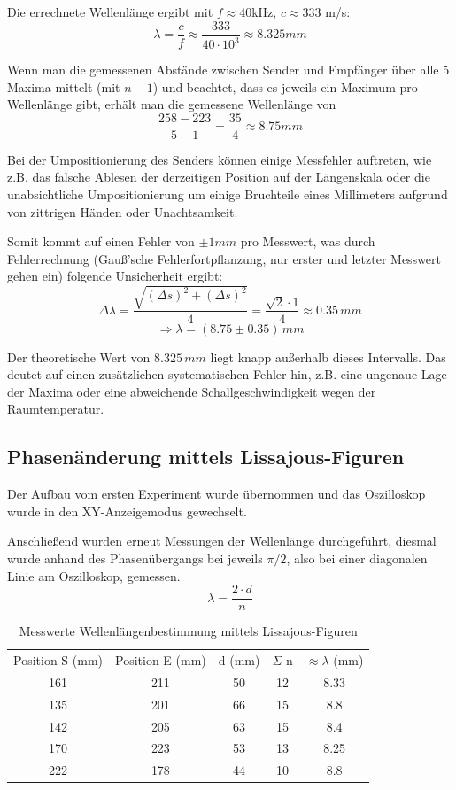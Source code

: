 \documentclass[
  headings=optiontotocandhead,
  twoside,
  openright,
  numbers=noenddot,
  toc=flat,
  11pt,
  parskip=full,
  listof=flat,
  bibliography=totoc,
  a4paper,
  DIV=14,
  BCOR=22mm,
  headheight=5mm,
  headinclude=true,
]{scrartcl}
\begin{document}
Die errechnete Wellenlänge ergibt mit $f \approx 40$kHz, $c \approx 333$ m/s:
$$ \lambda = \frac{c}{f} \approx \frac{333}{40 \cdot 10^3} \approx 8.325 mm $$

Wenn man die gemessenen Abstände zwischen Sender und Empfänger über alle 5 Maxima mittelt (mit $n-1$) und beachtet, dass es jeweils ein Maximum pro Wellenlänge gibt, erhält man die gemessene Wellenlänge von
$$ \frac{258 - 223}{5 - 1} = \frac{35}{4} \approx 8.75mm $$ 

Bei der Umpositionierung des Senders können einige Messfehler auftreten, wie z.B. das falsche Ablesen der derzeitigen Position auf der Längenskala oder die unabsichtliche Umpositionierung um einige Bruchteile eines Millimeters aufgrund von zittrigen Händen oder Unachtsamkeit.

Somit kommt auf einen Fehler von $\pm 1mm$ pro Messwert, was durch Fehlerrechnung (Gauß'sche Fehlerfortpflanzung, nur erster und letzter Messwert gehen ein) folgende Unsicherheit ergibt:
$$ \Delta\lambda = \frac{\sqrt{(\Delta s)^2 + (\Delta s)^2}}{4} = \frac{\sqrt{2} \cdot 1}{4} \approx 0.35\,mm $$
$$ \Rightarrow \lambda = (8.75 \pm 0.35)\,mm $$

Der theoretische Wert von $8.325\,mm$ liegt knapp außerhalb dieses Intervalls. Das deutet auf einen zusätzlichen systematischen Fehler hin, z.B. eine ungenaue Lage der Maxima oder eine abweichende Schallgeschwindigkeit wegen der Raumtemperatur.

\subsection{Phasenänderung mittels Lissajous-Figuren}

Der Aufbau vom ersten Experiment wurde übernommen und das Oszilloskop wurde in den XY-Anzeigemodus gewechselt.

Anschließend wurden erneut Messungen der Wellenlänge durchgeführt, diesmal wurde anhand des Phasenübergangs bei jeweils $\pi/2$, also bei einer diagonalen Linie am Oszilloskop, gemessen.
$$ \lambda = \frac{2 \cdot d}{n} $$

\begin{table}[H]
  \centering
  \setlength{\tabcolsep}{10pt}
  \begin{tabular}{ |c|c|c|c|c| }
    \multicolumn{1}{c}{Position S (mm)} & \multicolumn{1}{c}{Position E (mm)} & \multicolumn{1}{c}{d (mm)} & \multicolumn{1}{c}{$\Sigma$ n} & \multicolumn{1}{c}{$\approx \lambda$ (mm)} \\
    161 & 211 & 50 & 12 & 8.33 \\
    135 & 201 & 66 & 15 & 8.8 \\
    142 & 205 & 63 & 15 & 8.4 \\
    170 & 223 & 53 & 13 & 8.25 \\
    222 & 178 & 44 & 10 & 8.8 \\
  \end{tabular}
  \caption{Messwerte Wellenlängenbestimmung mittels Lissajous-Figuren}
  \label{tab:wellenlaenge2}
\end{table}
\end{document}
